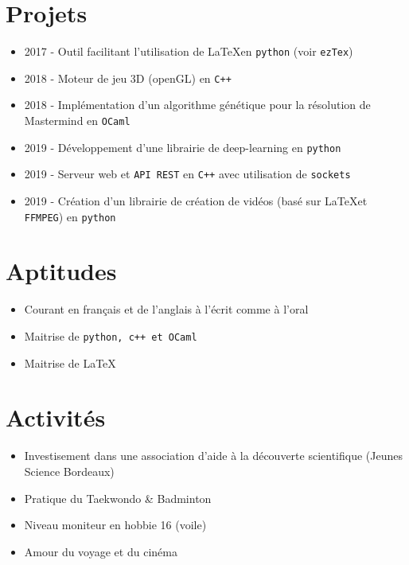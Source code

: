 \documentclass{res}
\begin{document}
{\section{\textbf{Projets}}
\begin{itemize}
\item 2017 - Outil facilitant l'utilisation de \LaTeX en \texttt{python} (voir \texttt{ezTex})
\item 2018 - Moteur de jeu 3D (openGL) en \texttt{C++}
\item 2018 - Implémentation d'un algorithme génétique pour la résolution de Mastermind en \texttt{OCaml}
\item 2019 - Développement d'une librairie de deep-learning en \texttt{python}
\item 2019 - Serveur web et \texttt{API REST} en \texttt{C++} avec utilisation de \texttt{sockets}
\item 2019 - Création d'un librairie de création de vidéos (basé sur \LaTeX et \texttt{FFMPEG}) en \texttt{python}
\end{itemize}

  \vskip 0.7cm

\section{\textbf{Aptitudes}}
\begin{itemize}
\item Courant en français et de l'anglais à l'écrit comme à l'oral
\item Maitrise de \texttt{python, c++ et OCaml}
\item Maitrise de \LaTeX
\end{itemize}

\vskip 0.7cm

\section{\textbf{Activités}}
\begin{itemize}
\item Investisement dans une association d'aide à la découverte scientifique (Jeunes Science Bordeaux)
\item Pratique du Taekwondo \& Badminton
\item Niveau moniteur en hobbie 16 (voile)
\item Amour du voyage et du cinéma
\end{itemize}

\vfill} %
\end{document}
